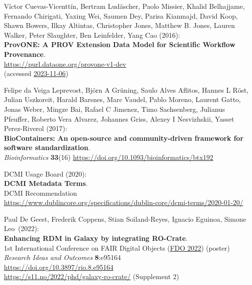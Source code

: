 \begin{thebibliography}{9}
Víctor Cuevas-Vicenttín, Bertram Ludäscher, Paolo Missier, Khalid Belhajjame, Fernando Chirigati, Yaxing Wei, Saumen Dey, Parisa Kianmajd, David Koop, Shawn Bowers, Ilkay Altintas, Christopher Jones, Matthew B. Jones, Lauren Walker, Peter Slaughter, Ben Leinfelder, Yang Cao (2016):\\
\textbf{ProvONE: A PROV Extension Data Model for Scientific Workflow Provenance}.\\
\url{https://purl.dataone.org/provone-v1-dev}\\
(accessed \href{https://web.archive.org/web/20231106005203/http://jenkins-1.dataone.org/jenkins/view/Documentation%20Projects/job/ProvONE-Documentation-trunk/ws/provenance/ProvONE/v1/provone.html}{2023-11-06})

Felipe da Veiga Leprevost, Björn A Grüning, Saulo Alves Aflitos, Hannes L Röst, Julian Uszkoreit, Harald Barsnes, Marc Vaudel, Pablo Moreno, Laurent Gatto, Jonas Weber, Mingze Bai, Rafael C Jimenez, Timo Sachsenberg, Julianus Pfeuffer, Roberto Vera Alvarez, Johannes Griss, Alexey I Nesvizhskii, Yasset Perez-Riverol (2017):\\
\textbf{BioContainers: An open-source and community-driven framework for software standardization}.\\
\emph{Bioinformatics} \textbf{33}(16) 
\url{https://doi.org/10.1093/bioinformatics/btx192}

DCMI Usage Board (2020): \\
\textbf{DCMI Metadata Terms}. \\
DCMI Recommendation\\
\url{https://www.dublincore.org/specifications/dublin-core/dcmi-terms/2020-01-20/}

Paul De Geest, Frederik Coppens, Stian
Soiland-Reyes, Ignacio Eguinoa, Simone Leo~(2022):\\
\textbf{Enhancing RDM in Galaxy by integrating RO-Crate}.\\
1st International Conference on FAIR Digital Objects
(\href{https://www.fdo2022.org/}{FDO 2022}) (poster)\\
\emph{Research Ideas and Outcomes} \textbf{8}:e95164\\
\url{https://doi.org/10.3897/rio.8.e95164}\\
\url{https://s11.no/2022/phd/galaxy-ro-crate/} (Supplement 2)


\end{thebibliography}
